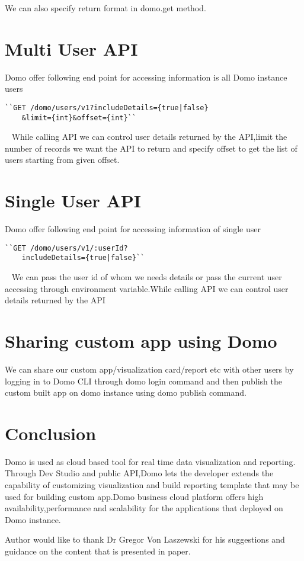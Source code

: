 We can also specify return format in domo.get method.


\section{Multi User API}
Domo offer following end point for accessing information is all
Domo instance users
\begin{verbatim}
``GET /domo/users/v1?includeDetails={true|false}
	&limit={int}&offset={int}``
\end{verbatim}
~\cite{hid-sp18-523-User}
While calling API we can control user details returned by the API,limit
the number of records we want the API to return and specify offset to get
the list of users starting from given offset. 
~\cite{hid-sp18-523-User} 

\section{Single User API}
Domo offer following end point for accessing information of single user
\begin{verbatim}
``GET /domo/users/v1/:userId?
	includeDetails={true|false}``
\end{verbatim}
~\cite{hid-sp18-523-User}
We can pass the user id of whom we needs details or pass the current user
accessing through environment variable.While calling API we can control 
user details returned by the API~\cite{hid-sp18-523-User} 


\section{Sharing custom app using Domo}
We can share our custom app/visualization card/report etc with other users
by logging in to Domo CLI through domo login command and then publish the 
custom built app on domo instance using domo publish command. 


\section{Conclusion}
Domo is used as cloud based tool for real time data visualization and 
reporting. Through Dev Studio and public API,Domo lets the developer
extends the capability of customizing visualization and build reporting
template that may be used for building custom app.Domo business cloud
platform offers high availability,performance and scalability for the
applications that deployed on Domo instance.


\begin{acks}

Author would like to thank Dr Gregor Von Laszewski for his suggestions 
and guidance on the content that is presented in paper.
\end{acks}


 

